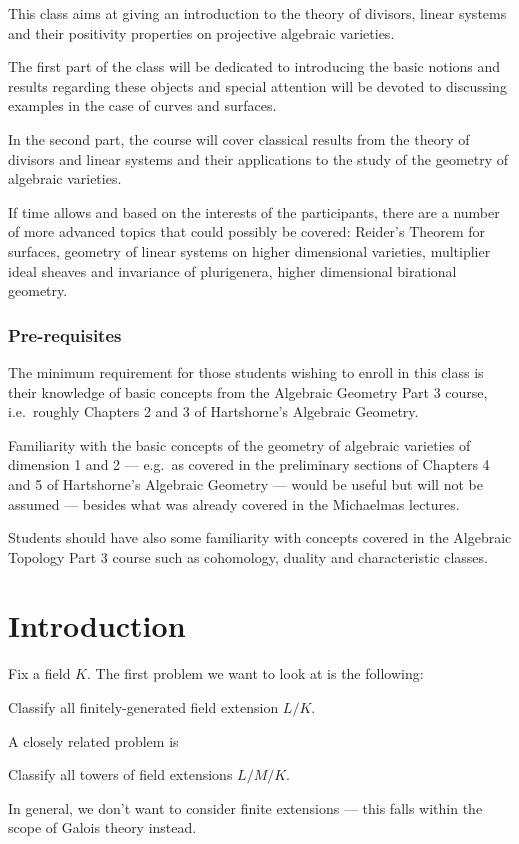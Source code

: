 \documentclass[a4paper]{article}
\begin{document}
\maketitle
{\small
\setlength{\parindent}{0em}
\setlength{\parskip}{1em}
This class aims at giving an introduction to the theory of divisors, linear systems and their positivity properties on projective algebraic varieties.

The first part of the class will be dedicated to introducing the basic notions and results regarding these objects and special attention will be devoted to discussing examples in the case of curves and surfaces.

In the second part, the course will cover classical results from the theory of divisors and linear systems and their applications to the study of the geometry of algebraic varieties.

If time allows and based on the interests of the participants, there are a number of more advanced topics that could possibly be covered: Reider's Theorem for surfaces, geometry of linear systems on higher dimensional varieties, multiplier ideal sheaves and invariance of plurigenera, higher dimensional birational geometry.

\subsubsection*{Pre-requisites}
The minimum requirement for those students wishing to enroll in this class is their knowledge of basic concepts from the Algebraic Geometry Part 3 course, i.e.\ roughly Chapters 2 and 3 of Hartshorne's Algebraic Geometry.

Familiarity with the basic concepts of the geometry of algebraic varieties of dimension 1 and 2 --- e.g.\ as covered in the preliminary sections of Chapters 4 and 5 of Hartshorne's Algebraic Geometry --- would be useful but will not be assumed --- besides what was already covered in the Michaelmas lectures.

Students should have also some familiarity with concepts covered in the Algebraic Topology Part 3 course such as cohomology, duality and characteristic classes.
}
\tableofcontents

\section{Introduction}
Fix a field $K$. The first problem we want to look at is the following:
\begin{problem}
  Classify all finitely-generated field extension $L/K$.
\end{problem}
A closely related problem is
\begin{problem}
  Classify all towers of field extensions $L/M/K$.
\end{problem}
In general, we don't want to consider finite extensions --- this falls within the scope of Galois theory instead.
\end{document}
